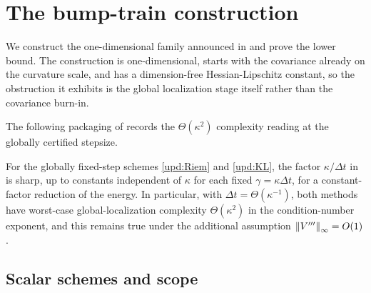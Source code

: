 \section{The bump-train construction}
\label{app:bump}

We construct the one-dimensional family announced in  and prove the lower
bound. The construction is one-dimensional, starts with the covariance already on the curvature
scale, and has a dimension-free Hessian-Lipschitz constant, so the obstruction it exhibits is
the global localization stage itself rather than the covariance burn-in.

The following packaging of  records the $\Theta(\kappa^2)$ complexity
reading at the globally certified stepsize.

\begin{corollary}\label{cor:sharp-disc}
    For the globally fixed-step schemes \eqref{upd:Riem} and \eqref{upd:KL}, the factor
    $\kappa/\Delta t$ in  is sharp, up to constants independent
    of $\kappa$ for each fixed $\gamma=\kappa\Delta t$, for a constant-factor reduction of the
    energy. In particular, with $\Delta t=\Theta(\kappa^{-1})$, both methods have worst-case
    global-localization complexity $\Theta(\kappa^2)$ in the condition-number exponent, and
    this remains true under the additional assumption $\left\lVert V'''\right\rVert_\infty=O(1)$.
\end{corollary}

\subsection{Scalar schemes and scope}

